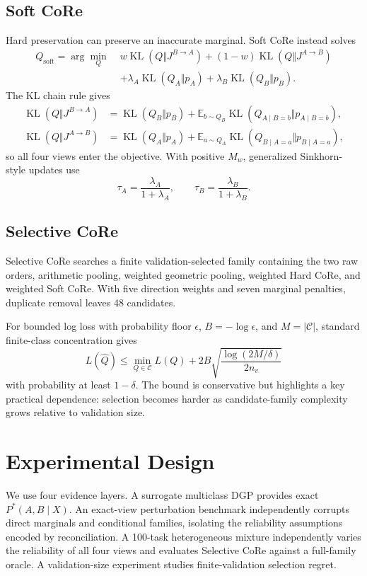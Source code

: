 \documentclass[twoside,11pt]{article}
\newcommand{\KL}{\operatorname{KL}}
\newcommand{\E}{\mathbb{E}}
\newcommand{\Jone}{J^{B\rightarrow A}}
\newcommand{\Jtwo}{J^{A\rightarrow B}}
\newcommand{\Qsoft}{Q_{\mathrm{soft}}}
\newcommand{\Cset}{\mathcal{C}}
\begin{document}
\subsection{Soft CoRe}
Hard preservation can preserve an inaccurate marginal. Soft CoRe instead solves
\begin{align}
\Qsoft=\arg\min_Q\;&w\KL(Q\Vert\Jone)+(1-w)\KL(Q\Vert\Jtwo)\nonumber\\
&+\lambda_A\KL(Q_A\Vert p_A)+\lambda_B\KL(Q_B\Vert p_B).
\end{align}
The KL chain rule gives
\begin{align}
\KL(Q\Vert\Jone)&=\KL(Q_B\Vert p_B)+\E_{b\sim Q_B}\KL(Q_{A\mid B=b}\Vert p_{A\mid B=b}),\\
\KL(Q\Vert\Jtwo)&=\KL(Q_A\Vert p_A)+\E_{a\sim Q_A}\KL(Q_{B\mid A=a}\Vert p_{B\mid A=a}),
\end{align}
so all four views enter the objective. With positive $M_w$, generalized Sinkhorn-style updates use
\begin{equation}
\tau_A=\frac{\lambda_A}{1+\lambda_A},\qquad \tau_B=\frac{\lambda_B}{1+\lambda_B}.
\end{equation}

\subsection{Selective CoRe}
Selective CoRe searches a finite validation-selected family containing the two raw orders, arithmetic pooling, weighted geometric pooling, weighted Hard CoRe, and weighted Soft CoRe. With five direction weights and seven marginal penalties, duplicate removal leaves 48 candidates.

For bounded log loss with probability floor $\epsilon$, $B=-\log\epsilon$, and $M=|\Cset|$, standard finite-class concentration gives
\begin{equation}
L(\hat Q)\le \min_{Q\in\Cset}L(Q)+2B\sqrt{\frac{\log(2M/\delta)}{2n_v}}
\end{equation}
with probability at least $1-\delta$. The bound is conservative but highlights a key practical dependence: selection becomes harder as candidate-family complexity grows relative to validation size.

\section{Experimental Design}
We use four evidence layers. A surrogate multiclass DGP provides exact $P^*(A,B\mid X)$. An exact-view perturbation benchmark independently corrupts direct marginals and conditional families, isolating the reliability assumptions encoded by reconciliation. A 100-task heterogeneous mixture independently varies the reliability of all four views and evaluates Selective CoRe against a full-family oracle. A validation-size experiment studies finite-validation selection regret.
\end{document}
